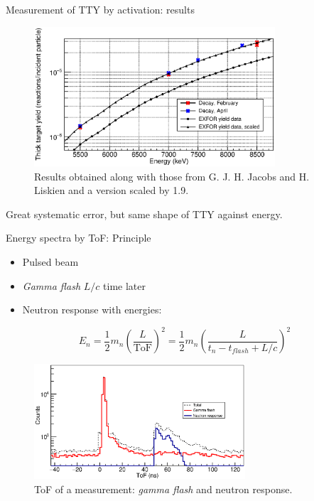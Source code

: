 \documentclass[11pt]{beamer}
\begin{document}
\begin{frame}{Measurement of TTY by activation: results}
	\begin{figure}[H]
		\centering
		\includegraphics[width=0.80\textwidth]{activation_final_results.eps}
		\caption{Results obtained along with those from G. J. H. Jacobs and H. Liskien \cite{jacobs} and a version scaled by \num{1.9}.}
		\label{activation_final_results}
	\end{figure}
	Great systematic error, but same shape of TTY against energy.
\end{frame}







\begin{frame}{Energy spectra by ToF: Principle}
	\begin{itemize}
		\item Pulsed beam
		\item \textit{Gamma flash} $L/c$ time later
		\item Neutron response with energies:
	\end{itemize}
	\begin{equation}
		E_n=\frac{1}{2} m_n \left( \frac{L}{\text{ToF}} \right)^2 = \frac{1}{2} m_n \left( \frac{L}{t_n - t_{flash} + L/c} \right)^2
	\end{equation}
	\begin{figure}[H]
		\centering
		\includegraphics[width=0.70\textwidth]{separated_tof.eps}
		\caption{ToF of a measurement: \textit{gamma flash} and neutron response.}
		\label{separated_tof}
	\end{figure}
\end{frame}
\end{document}
